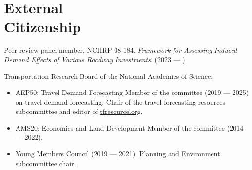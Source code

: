 \documentclass[margin,line]{res}
\newcommand{\acc}{\scshape }
\begin{document}
\begin{resume}
\begin{description}
\end{description}

\section{External \\ Citizenship}



Peer review panel member, NCHRP 08-184, \textit{Framework for Assessing Induced Demand Effects of Various Roadway Investments}. (2023 --- )


Transportation Research Board of the National Academies of Science:

\begin{itemize}
  \item AEP50: Travel Demand Forecasting Member of the committee (2019 --- 2025) on
  travel demand forecasting. Chair of the travel forecasting resources
  subcommittee and editor of \url{tfresource.org}.
  \item AMS20: Economics and Land Development Member of the committee (2014
  --- 2022). 
  \item Young Members Council (2019 --- 2021). Planning and Environment subcommittee
  chair.
\end{itemize}



\end{resume}
\end{document}
